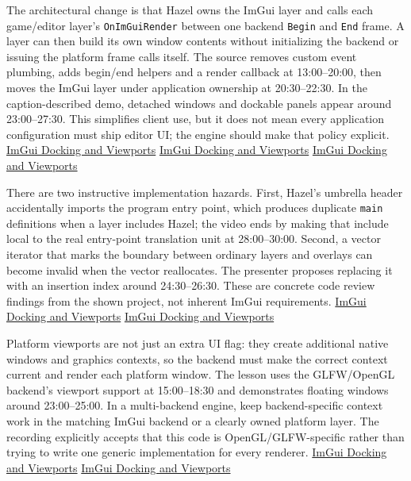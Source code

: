 The architectural change is that Hazel owns the ImGui layer and calls each game/editor layer's \texttt{OnImGuiRender} between one backend \texttt{Begin} and \texttt{End} frame. A layer can then build its own window contents without initializing the backend or issuing the platform frame calls itself. The source removes custom event plumbing, adds begin/end helpers and a render callback at 13:00--20:00, then moves the ImGui layer under application ownership at 20:30--22:30. In the caption-described demo, detached windows and dockable panels appear around 23:00--27:30. This simplifies client use, but it does not mean every application configuration must ship editor UI; the engine should make that policy explicit. \href{https://www.youtube.com/watch?v=lZuje-3iyVE&t=780s}{ImGui Docking and Viewports} \href{https://www.youtube.com/watch?v=lZuje-3iyVE&t=1020s}{ImGui Docking and Viewports} \href{https://www.youtube.com/watch?v=lZuje-3iyVE&t=1380s}{ImGui Docking and Viewports}

There are two instructive implementation hazards. First, Hazel's umbrella header accidentally imports the program entry point, which produces duplicate \texttt{main} definitions when a layer includes Hazel; the video ends by making that include local to the real entry-point translation unit at 28:00--30:00. Second, a vector iterator that marks the boundary between ordinary layers and overlays can become invalid when the vector reallocates. The presenter proposes replacing it with an insertion index around 24:30--26:30. These are concrete code review findings from the shown project, not inherent ImGui requirements. \href{https://www.youtube.com/watch?v=lZuje-3iyVE&t=1680s}{ImGui Docking and Viewports} \href{https://www.youtube.com/watch?v=lZuje-3iyVE&t=1470s}{ImGui Docking and Viewports}

Platform viewports are not just an extra UI flag: they create additional native windows and graphics contexts, so the backend must make the correct context current and render each platform window. The lesson uses the GLFW/OpenGL backend's viewport support at 15:00--18:30 and demonstrates floating windows around 23:00--25:00. In a multi-backend engine, keep backend-specific context work in the matching ImGui backend or a clearly owned platform layer. The recording explicitly accepts that this code is OpenGL/GLFW-specific rather than trying to write one generic implementation for every renderer. \href{https://www.youtube.com/watch?v=lZuje-3iyVE&t=900s}{ImGui Docking and Viewports} \href{https://www.youtube.com/watch?v=lZuje-3iyVE&t=1380s}{ImGui Docking and Viewports}

